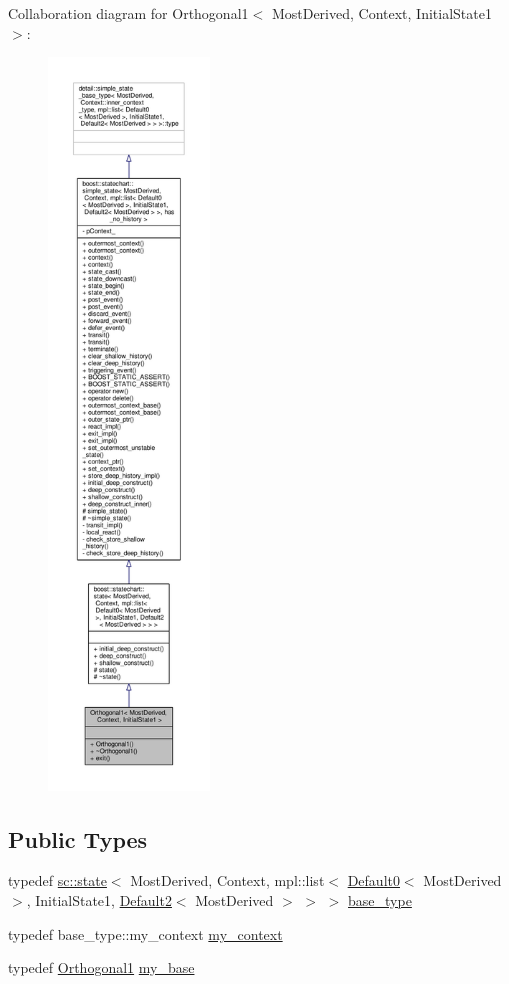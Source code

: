 Collaboration diagram for Orthogonal1$<$ Most\+Derived, Context, Initial\+State1 $>$\+:
\nopagebreak
\begin{figure}[H]
\begin{center}
\leavevmode
\includegraphics[height=550pt]{struct_orthogonal1__coll__graph}
\end{center}
\end{figure}
\subsection*{Public Types}
\begin{DoxyCompactItemize}
\item 
typedef \mbox{\hyperlink{classboost_1_1statechart_1_1state}{sc\+::state}}$<$ Most\+Derived, Context, mpl\+::list$<$ \mbox{\hyperlink{struct_default0}{Default0}}$<$ Most\+Derived $>$, Initial\+State1, \mbox{\hyperlink{struct_default2}{Default2}}$<$ Most\+Derived $>$ $>$ $>$ \mbox{\hyperlink{struct_orthogonal1_a2658c641be88f6894b543e14a3102447}{base\+\_\+type}}
\item 
typedef base\+\_\+type\+::my\+\_\+context \mbox{\hyperlink{struct_orthogonal1_a8cee9db1dad468ee5f8e34871d7a4ae2}{my\+\_\+context}}
\item 
typedef \mbox{\hyperlink{struct_orthogonal1}{Orthogonal1}} \mbox{\hyperlink{struct_orthogonal1_a14beb6cc5bb2d03c3fe75d554a09a0a9}{my\+\_\+base}}
\end{DoxyCompactItemize}
